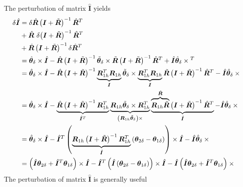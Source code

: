 \documentclass[10pt,fleqn,subeqn]{report}
\newcommand{\T}[1]{\bm{#1}}
\newcommand{\TT}[1]{\bm{#1}}
\begin{document}
The perturbation of matrix $\hat{\TT{I}}$ yields
\begin{subequations}
\begin{align}
	\delta\hat{\T{I}}
	&= \delta\hat{\T{R}} \plbr{\T{I} + \tilde{\T{R}}}^{-1} \hat{\T{R}}^T
	\nonumber \\
	& \mbox{}
	+ \hat{\T{R}} \ \delta\! \plbr{\T{I} + \tilde{\T{R}}}^{-1} \hat{\T{R}}^T
	\nonumber \\
	& \mbox{}
	+ \hat{\T{R}} \plbr{\T{I} + \tilde{\T{R}}}^{-1} \delta\hat{\T{R}}^T \\
	&= \hat{\T{\theta}}_{\delta}\times\hat{\TT{I}}
		- \hat{\TT{R}} \plbr{\TT{I} + \tilde{\TT{R}}}^{-1}
			\tilde{\T{\theta}}_{\delta}\times\tilde{\TT{R}}
			\plbr{\TT{I} + \tilde{\TT{R}}}^{-1} \hat{\TT{R}}^T
		+ \hat{\TT{I}} \hat{\T{\theta}}_{\delta}\times{}^T
	\nonumber \\
	&= \hat{\T{\theta}}_{\delta}\times\hat{\TT{I}}
	- \hat{\TT{R}} \plbr{\TT{I} + \tilde{\TT{R}}}^{-1}
		\underbrace{\TT{R}_{1h}^T \TT{R}_{1h}}_{\TT{I}}
		\tilde{\T{\theta}}_{\delta}\times \underbrace{\TT{R}_{1h}^T \TT{R}_{1h}}_{\TT{I}} \tilde{\TT{R}} 
		\plbr{\TT{I} + \tilde{\TT{R}}}^{-1} \hat{\TT{R}}^T
	- \hat{\TT{I}} \hat{\T{\theta}}_{\delta}\times{}
	\nonumber \\
	&= \hat{\T{\theta}}_{\delta}\times\hat{\TT{I}}
	- \underbrace{\hat{\TT{R}} \plbr{\TT{I} + \tilde{\TT{R}}}^{-1} \TT{R}_{1h}^T}_{\hat{\TT{I}}^T}
		\underbrace{
			\TT{R}_{1h} \tilde{\T{\theta}}_{\delta}\times \TT{R}_{1h}^T
		}_{\plbr{\TT{R}_{1h} \tilde{\T{\theta}}_{\delta}}\times{}}
		\underbrace{
			\overbrace{\TT{R}_{1h} \tilde{\TT{R}}}^{\hat{\TT{R}}} \plbr{\TT{I} + \tilde{\TT{R}}}^{-1} \hat{\TT{R}}^T
		}_{\hat{\TT{I}}}
	- \hat{\TT{I}} \hat{\T{\theta}}_{\delta}\times{}
	\nonumber \\
	&= \hat{\T{\theta}}_{\delta}\times\hat{\TT{I}}
	- \hat{\TT{I}}^T \plbr{
		\underbrace{
			\TT{R}_{1h}\plbr{\TT{I} + \tilde{\TT{R}}}^{-1}\TT{R}_{1h}^T
		}_{\hat{\TT{I}}} \plbr{\T{\theta}_{2\delta} - \T{\theta}_{1\delta}}
	}\times \hat{\TT{I}}
	- \hat{\TT{I}} \hat{\T{\theta}}_{\delta}\times{}
	\nonumber \\
	&= \plbr{\hat{\TT{I}}\T{\theta}_{2\delta} + \hat{\TT{I}}^T\T{\theta}_{1\delta}}\times\hat{\TT{I}}
	- \hat{\TT{I}}^T \plbr{\hat{\TT{I}}\plbr{\T{\theta}_{2\delta} - \T{\theta}_{1\delta}}}\times \hat{\TT{I}}
	- \hat{\TT{I}}\plbr{\hat{\TT{I}}\T{\theta}_{2\delta} + \hat{\TT{I}}^T\T{\theta}_{1\delta}}\times{}
\end{align}
\end{subequations}
The perturbation of matrix $\hat{\T{I}}$ is generally useful
\end{document}
